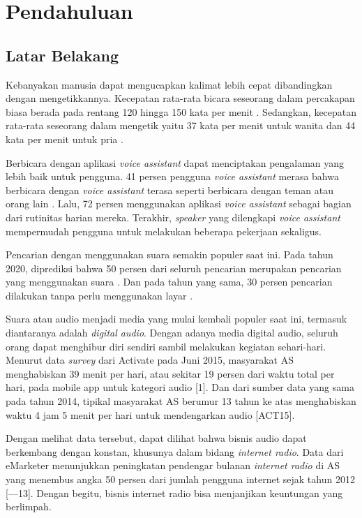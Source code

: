 \chapter{Pendahuluan}

\section{Latar Belakang}

Kebanyakan manusia dapat mengucapkan kalimat lebih cepat dibandingkan dengan mengetikkannya. Kecepatan rata-rata bicara seseorang dalam percakapan biasa berada pada rentang 120 hingga 150 kata per menit \parencite{barnard2018average}. Sedangkan, kecepatan rata-rata seseorang dalam mengetik yaitu 37 kata per menit untuk wanita dan 44 kata per menit untuk pria \parencite{ratatype}.

Berbicara dengan aplikasi \textit{voice assistant} dapat menciptakan pengalaman yang lebih baik untuk pengguna. 41 persen pengguna \textit{voice assistant} merasa bahwa berbicara dengan \textit{voice assistant} terasa seperti berbicara dengan teman atau orang lain \parencite{kleinberg2018five}. Lalu, 72 persen menggunakan aplikasi \textit{voice assistant} sebagai bagian dari rutinitas harian mereka. Terakhir, \textit{speaker} yang dilengkapi \textit{voice assistant} mempermudah pengguna untuk melakukan beberapa pekerjaan sekaligus.

Pencarian dengan menggunakan suara semakin populer saat ini. Pada tahun 2020, diprediksi bahwa 50 persen dari seluruh pencarian merupakan pencarian yang menggunakan suara \parencite{}. Dan pada tahun yang sama, 30 persen pencarian dilakukan tanpa perlu menggunakan layar \parencite{}.

Suara atau audio menjadi media yang mulai kembali populer saat ini, termasuk diantaranya adalah \textit{digital audio}. Dengan adanya media digital audio, seluruh orang dapat menghibur diri sendiri sambil melakukan kegiatan sehari-hari. Menurut data \textit{survey} dari Activate pada Juni 2015, masyarakat AS menghabiskan 39 menit per hari, atau sekitar 19 persen dari waktu total per hari, pada mobile app untuk kategori audio [1]. Dan dari sumber data yang sama pada tahun 2014, tipikal masyarakat AS berumur 13 tahun ke atas menghabiskan waktu 4 jam 5 menit per hari untuk mendengarkan audio [ACT15].

Dengan melihat data tersebut, dapat dilihat bahwa bisnis audio dapat berkembang dengan konstan, khusunya dalam bidang \textit{internet radio}. Data dari eMarketer menunjukkan peningkatan pendengar bulanan \textit{internet radio} di AS yang menembus angka 50 persen dari jumlah pengguna internet sejak tahun 2012 [---13]. Dengan begitu, bisnis internet radio bisa menjanjikan keuntungan yang berlimpah.

